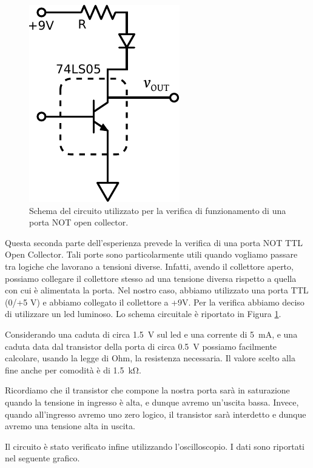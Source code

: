 \begin{figure}
\centering
\includegraphics[width=.2\textwidth]{../E10/latex/open_collector.pdf}
\caption{Schema del circuito utilizzato per la verifica di funzionamento di una porta NOT open collector.}
\label{cir10:open_collector}
\end{figure}

Questa seconda parte dell'esperienza prevede la verifica di una porta NOT TTL Open Collector.
Tali porte sono particolarmente utili quando vogliamo passare tra logiche che lavorano a tensioni diverse.
Infatti, avendo il collettore aperto, possiamo collegare il collettore stesso ad una tensione diversa rispetto a quella con cui è alimentata la porta.
Nel nostro caso, abbiamo utilizzato una porta TTL (0/+5 \si{\volt}) e abbiamo collegato il collettore a +9\si{\volt}.
Per la verifica abbiamo deciso di utilizzare un led luminoso.
Lo schema circuitale è riportato in Figura \ref{cir10:open_collector}.

Considerando una caduta di circa \SI{1.5}{\volt} sul led e una corrente di \SI{5}{\milli\ampere}, e una caduta data dal transistor della porta di circa \SI{0.5}{\volt} possiamo facilmente calcolare, usando la legge di Ohm, la resistenza necessaria.
Il valore scelto alla fine anche per comodità è di \SI{1.5}{\kilo\ohm}.

Ricordiamo che il transistor che compone la nostra porta sarà in saturazione quando la tensione in ingresso è alta, e dunque avremo un'uscita bassa.
Invece, quando all'ingresso avremo uno zero logico, il transistor sarà interdetto e dunque avremo una tensione alta in uscita.


Il circuito è stato verificato infine utilizzando l'oscilloscopio.
I dati sono riportati nel seguente grafico.

